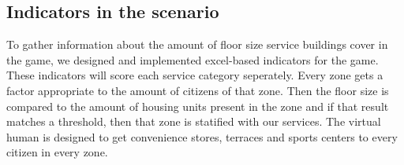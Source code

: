 \subsection{Indicators in the scenario}
To gather information about the amount of floor size service buildings cover in the game, we designed and implemented excel-based indicators for the game. These indicators will score each service category seperately. Every zone gets a factor appropriate to the amount of citizens of that zone. Then the floor size is compared to the amount of housing units present in the zone and if that result matches a threshold, then that zone is statified with our services. The virtual human is designed to get convenience stores, terraces and sports centers to every citizen in every zone.

\newpage